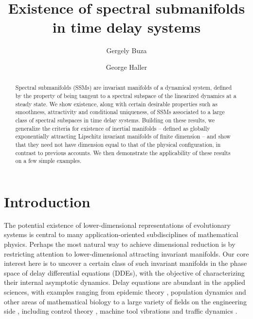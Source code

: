 \documentclass[a4paper, 12pt, oneside, reqno, notitlepage]{amsart}
\title
[Existence of spectral submanifolds in time delay systems] 
{Existence of spectral submanifolds in time delay systems}
\author{Gergely Buza}
\author{George Haller}
\theoremstyle{plain}
\theoremstyle{definition}
\theoremstyle{remark}
\begin{document}
\begin{abstract}
    Spectral submanifolds (SSMs) are invariant manifolds of a dynamical system, defined by the property of being tangent to a spectral subspace of the linearized dynamics at a steady state.
    We show existence, along with certain desirable properties such as smoothness, attractivity and conditional uniqueness, of SSMs associated to a large class of spectral subspaces in time delay systems.
    Building on these results, we generalize the criteria for existence of inertial manifolds -- defined as globally exponentially attracting Lipschitz invariant manifolds of finite dimension -- 
    and show that they need not have dimension equal to that of the physical configuration, in contrast to previous accounts.
    We then demonstrate the applicability of these results on a few simple examples.
\end{abstract}

\maketitle

\section{Introduction}


The potential existence of lower-dimensional representations of evolutionary systems is central to many application-oriented subdisciplines of mathematical physics.
Perhaps the most natural way to achieve dimensional reduction is by 
restricting attention to lower-dimensional attracting
invariant manifolds. 
Our core interest here is to uncover a certain class of such invariant manifolds in the phase space of delay differential equations (DDEs), with the objective of characterizing their internal asymptotic dynamics.
Delay  equations are abundant in the applied sciences, with examples ranging from epidemic theory \cite{diekmann2000mathematical}, population dynamics \cite{cushing2013integrodifferential} and other areas of mathematical biology \cite{glass2021nonlinear,milton2009time,zhang2018saturation} to a large variety of fields on the engineering side \cite{insperger2011semi}, including control theory \cite{richard2003time,habib2022bistability}, machine tool vibrations \cite{molnar2017analysis} and traffic dynamics \cite{orosz2010traffic}.
\end{document}

